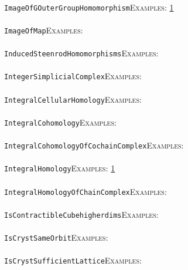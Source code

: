 \documentclass[a4paper,11pt]{report}
\begin{document}
{{ \\
 \texttt{ImageOfGOuterGroupHomomorphism}{\nobreakspace}{\nobreakspace}{\nobreakspace}{\nobreakspace}\textsc{Examples:} \href{../www/SideLinks/About/aboutCoefficientSequence.html} {1}{\nobreakspace} \\
 \\
 \texttt{ImageOfMap}{\nobreakspace}{\nobreakspace}{\nobreakspace}{\nobreakspace}\textsc{Examples:} \\
 \\
 \texttt{InducedSteenrodHomomorphisms}{\nobreakspace}{\nobreakspace}{\nobreakspace}{\nobreakspace}\textsc{Examples:} \\
 \\
 \texttt{IntegerSimplicialComplex}{\nobreakspace}{\nobreakspace}{\nobreakspace}{\nobreakspace}\textsc{Examples:} \\
 \\
 \texttt{IntegralCellularHomology}{\nobreakspace}{\nobreakspace}{\nobreakspace}{\nobreakspace}\textsc{Examples:} \\
 \\
 \texttt{IntegralCohomology}{\nobreakspace}{\nobreakspace}{\nobreakspace}{\nobreakspace}\textsc{Examples:} \\
 \\
 \texttt{IntegralCohomologyOfCochainComplex}{\nobreakspace}{\nobreakspace}{\nobreakspace}{\nobreakspace}\textsc{Examples:} \\
 \\
 \texttt{IntegralHomology}{\nobreakspace}{\nobreakspace}{\nobreakspace}{\nobreakspace}\textsc{Examples:} \href{../www/SideLinks/About/aboutPerformance.html} {1}{\nobreakspace} \\
 \\
 \texttt{IntegralHomologyOfChainComplex}{\nobreakspace}{\nobreakspace}{\nobreakspace}{\nobreakspace}\textsc{Examples:} \\
 \\
 \texttt{IsContractibleCube{\textunderscore}higherdims}{\nobreakspace}{\nobreakspace}{\nobreakspace}{\nobreakspace}\textsc{Examples:} \\
 \\
 \texttt{IsCrystSameOrbit}{\nobreakspace}{\nobreakspace}{\nobreakspace}{\nobreakspace}\textsc{Examples:} \\
 \\
 \texttt{IsCrystSufficientLattice}{\nobreakspace}{\nobreakspace}{\nobreakspace}{\nobreakspace}\textsc{Examples:} \\
 \\
}}
\end{document}
